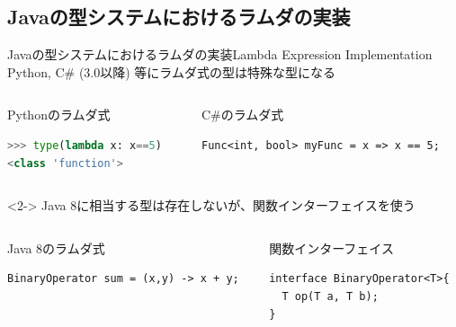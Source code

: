 \subsection{Javaの型システムにおけるラムダの実装}
\begin{frame}[fragile]{Javaの型システムにおけるラムダの実装}{Lambda Expression Implementation}
Python, C\# (3.0以降) 等にラムダ式の型は特殊な型になる
\begin{columns}
\begin{column}{0.5\textwidth}
\begin{block}{Pythonのラムダ式}
\begin{lstlisting}[language=Python]
>>> type(lambda x: x==5)
<class 'function'>
\end{lstlisting}
\end{block}
\end{column}
\begin{column}{0.5\textwidth}
\begin{block}{C\#のラムダ式}
\begin{lstlisting}[style=sharpc]
Func<int, bool> myFunc = x => x == 5;
\end{lstlisting}
\end{block}
\end{column}
\end{columns}
\begin{uncoverenv}<2->
Java 8に相当する型は存在しないが、関数インターフェイスを使う
\begin{columns}
\begin{column}{0.5\textwidth}
\begin{block}{Java 8のラムダ式}
\begin{lstlisting}
BinaryOperator sum = (x,y) -> x + y;
\end{lstlisting}
\end{block}
\end{column}
\begin{column}{0.5\textwidth}
\begin{block}{関数インターフェイス}
\begin{lstlisting}
interface BinaryOperator<T>{
  T op(T a, T b);
}
\end{lstlisting}
\end{block}
\end{column}
\end{columns}
\end{uncoverenv}
\end{frame}
